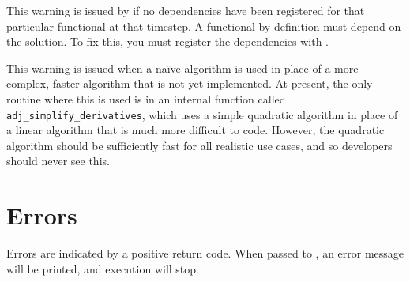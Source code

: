 This warning is issued by  if no dependencies have been
registered for that particular functional at that timestep. A functional by definition must depend on the solution. To fix this, you must register the dependencies with
.

This warning is issued when a na\"ive algorithm is used in place of a more complex,
faster algorithm that is not yet implemented. At present, the only routine where
this is used is in an internal function called \texttt{adj_simplify_derivatives}, which uses a simple quadratic
algorithm in place of a linear algorithm that is much more difficult to code.
However, the quadratic algorithm should be sufficiently fast for all realistic
use cases, and so developers should never see this.

\section{Errors}
Errors are indicated by a positive return code. When passed to ,
an error message will be printed, and execution will stop.

